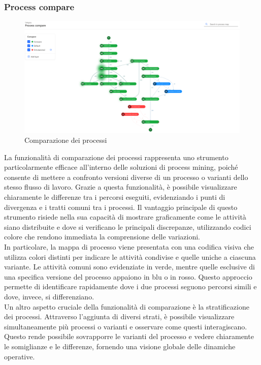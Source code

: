 \documentclass{article}
\begin{document}
\subsubsection{Process compare}
\begin{figure}[H]
    \centering
    \includegraphics[width=\textwidth]{imgMicrosoft/TerzaSimulazione/ProcessComapareSimulazione3.png}
    \caption{Comparazione dei processi}
    \label{fig:process-compare}
\end{figure}
La funzionalità di comparazione dei processi rappresenta uno strumento particolarmente efficace all'interno delle soluzioni di process mining, poiché consente di mettere a confronto versioni diverse di un processo o varianti dello stesso flusso di lavoro. Grazie a questa funzionalità, è possibile visualizzare chiaramente le differenze tra i percorsi eseguiti, evidenziando i punti di divergenza e i tratti comuni tra i processi. Il vantaggio principale di questo strumento risiede nella sua capacità di mostrare graficamente come le attività siano distribuite e dove si verificano le principali discrepanze, utilizzando codici colore che rendono immediata la comprensione delle variazioni.\\
In particolare, la mappa di processo viene presentata con una codifica visiva che utilizza colori distinti per indicare le attività condivise e quelle uniche a ciascuna variante. Le attività comuni sono evidenziate in verde, mentre quelle esclusive di una specifica versione del processo appaiono in blu o in rosso. Questo approccio permette di identificare rapidamente dove i due processi seguono percorsi simili e dove, invece, si differenziano.\\
Un altro aspetto cruciale della funzionalità di comparazione è la stratificazione dei processi. Attraverso l’aggiunta di diversi strati, è possibile visualizzare simultaneamente più processi o varianti e osservare come questi interagiscano. Questo rende possibile sovrapporre le varianti del processo e vedere chiaramente le somiglianze e le differenze, fornendo una visione globale delle dinamiche operative.\\
\end{document}

